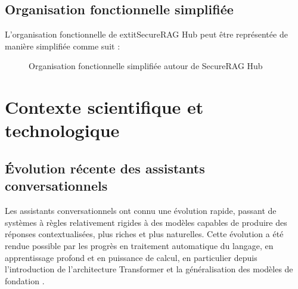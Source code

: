 \subsection{Organisation fonctionnelle simplifiée}

L'organisation fonctionnelle de 	extit{SecureRAG Hub} peut être représentée de manière simplifiée comme suit :

\begin{figure}[htbp]
    \centering
    \caption{Organisation fonctionnelle simplifiée autour de SecureRAG Hub}
    \label{fig:organigramme_fonctionnel_securerag}
\end{figure}

\section{Contexte scientifique et technologique}

\subsection{Évolution récente des assistants conversationnels}

Les assistants conversationnels ont connu une évolution rapide, passant de systèmes à règles relativement rigides à des modèles capables de produire des réponses contextualisées, plus riches et plus naturelles. Cette évolution a été rendue possible par les progrès en traitement automatique du langage, en apprentissage profond et en puissance de calcul, en particulier depuis l’introduction de l’architecture Transformer et la généralisation des modèles de fondation \cite{vaswani_transformer_2017,bommasani_foundation_models_2021,stanford_ai_index_2025}.

